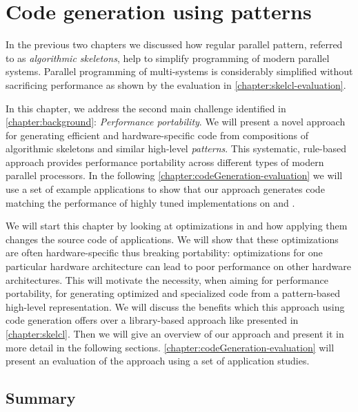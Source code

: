 
\chapter{Code generation using patterns}

\label{ch:fifth} %
\label{chapter:codeGeneration}

In the previous two chapters we discussed how regular parallel pattern, referred to as \emph{algorithmic skeletons}, help to simplify programming of modern parallel systems.
Parallel programming of multi-\GPU systems is considerably simplified without sacrificing performance as shown by the evaluation in \autoref{chapter:skelcl-evaluation}.

In this chapter, we address the second main challenge identified in \autoref{chapter:background}: \emph{Performance portability}.
We will present a novel approach for generating efficient and hardware-specific code from compositions of algorithmic skeletons and similar high-level \emph{patterns}.
This systematic, rule-based approach provides performance portability across different types of modern parallel processors. 
In the following \autoref{chapter:codeGeneration-evaluation} we will use a set of example applications to show that our approach generates code matching the performance of highly tuned implementations on \CPUs and \GPUs.

We will start this chapter by looking at optimizations in \OpenCL and how applying them changes the source code of applications.
We will show that these optimizations are often hardware-specific thus breaking portability: optimizations for one particular hardware architecture can lead to poor performance on other hardware architectures.
This will motivate the necessity, when aiming for performance portability, for generating optimized and specialized code from a pattern-based high-level representation.
We will discuss the benefits which this approach using code generation offers over a library-based approach like \SkelCL presented in \autoref{chapter:skelcl}.
Then we will give an overview of our approach and present it in more detail in the following sections.
\autoref{chapter:codeGeneration-evaluation} will present an evaluation of the approach using a set of application studies.











\section{Summary}

